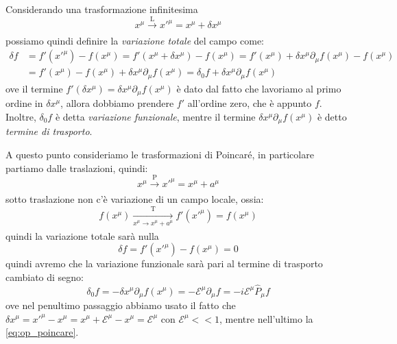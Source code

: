 Considerando una trasformazione infinitesima 
\begin{equation}
  x^\mu\xrightarrow[\text{}]{\text{L}}x'^{\mu}=x^{\mu} +\delta x^\mu
\end{equation}
possiamo quindi definire la \textit{variazione totale} del campo come:
\begin{equation}
\begin{aligned}
\delta f&=f'(x'^\mu)-f(x^\mu)=f'(x^\mu+\delta x^\mu)-f(x^\mu)=f'(x^\mu)+\delta x^\mu\partial_\mu f(x^\mu)-f(x^\mu)\\
&=f'(x^\mu)-f(x^\mu)+\delta x^\mu\partial_\mu f(x^\mu)=\delta_0 f +\delta x^\mu\partial_\mu f(x^\mu)
\end{aligned}
\end{equation}
ove il termine $f'(\delta x^\mu)=\delta x^\mu\partial_\mu f(x^\mu)$ è dato dal fatto che lavoriamo al primo ordine in $\delta x^\mu$, allora dobbiamo prendere $f'$ all'ordine zero, che è appunto $f$. Inoltre, $\delta_0 f$ è detta \textit{variazione funzionale}, mentre il termine $\delta x^\mu\partial_\mu f(x^\mu)$ è detto \textit{termine di trasporto}.

A questo punto consideriamo le trasformazioni di Poincaré, in particolare partiamo dalle traslazioni, quindi:
\begin{equation}
  x^\mu\xrightarrow[\text{}]{\text{P}}x'^{\mu}= x^{\mu} +a^\mu
\end{equation}
sotto traslazione non c'è variazione di un campo locale, ossia:
\begin{equation}
  f(x^\mu)\xrightarrow[\text{$x^\mu\xrightarrow[\text{}]{\text{}}x^{\mu} +a^\mu$}]{\text{T}}f'(x'^{\mu})=f(x^\mu)
\end{equation}
quindi la variazione totale sarà nulla
\begin{equation}
    \delta f=f'(x'^\mu)-f(x^\mu)=0
\end{equation}
quindi avremo che la variazione funzionale sarà pari al termine di trasporto cambiato di segno:
\begin{equation}
    \delta_0 f =-\delta x^\mu\partial_\mu f(x^\mu)=-\mathcal{E}^\mu \partial_\mu f=-i\mathcal{E}^\mu \hat{P}_\mu f
\end{equation}
ove nel penultimo passaggio abbiamo usato il fatto che $\delta x^\mu=x'^\mu-x^\mu=x^\mu+\mathcal{E}^\mu-x^\mu=\mathcal{E}^\mu$ con $\mathcal{E}^\mu<<1$, mentre nell'ultimo la \eqref{eq:op_poincare}.

